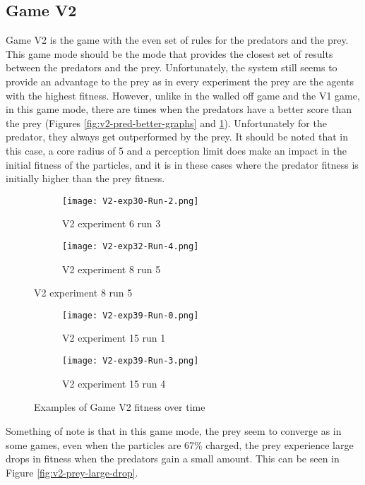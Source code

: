 \subsection{Game V2}
Game V2 is the game with the even set of rules for the predators and the prey. This game mode should be the mode that provides the closest set of results between the predators and the prey. Unfortunately, the system still seems to provide an advantage to the prey as in every experiment the prey are the agents with the highest fitness. However, unlike in the walled off game and the V1 game, in this game mode, there are times when the predators have a better score than the prey (Figures \ref{fig:v2-pred-better-graphs} and \ref{fig:v2-pred-better-graphs-2}). Unfortunately for the predator, they always get outperformed by the prey. It should be noted that in this case, a core radius of 5 and a perception limit does make an impact in the initial fitness of the particles, and it is in these cases where the predator fitness is initially higher than the prey fitness.

\begin{figure}
  \centering
  \begin{subfigure}{.7\textwidth}
  \texttt{[image: V2-exp30-Run-2.png]}
  \caption{V2 experiment 6 run 3}
  \end{subfigure}
  \begin{subfigure}{.7\textwidth}
  \texttt{[image: V2-exp32-Run-4.png]}
  \caption{V2 experiment 8 run 5}
  \end{subfigure}
 \end{figure}


\begin{figure}
  \centering
  \begin{subfigure}{.7\textwidth}
  \texttt{[image: V2-exp39-Run-0.png]}
  \caption{V2 experiment 15 run 1}
  \end{subfigure}
  \begin{subfigure}{.7\textwidth}
  \texttt{[image: V2-exp39-Run-3.png]}
  \caption{V2 experiment 15 run 4}
  \end{subfigure}
  \caption{Examples of Game V2 fitness over time \label{fig:v2-pred-better-graphs-2}}
\end{figure}

Something of note is that in this game mode, the prey seem to converge as in some games, even when the particles are 67\% charged, the prey experience large drops in fitness when the predators gain a small amount. This can be seen in Figure \ref{fig:v2-prey-large-drop}. 


